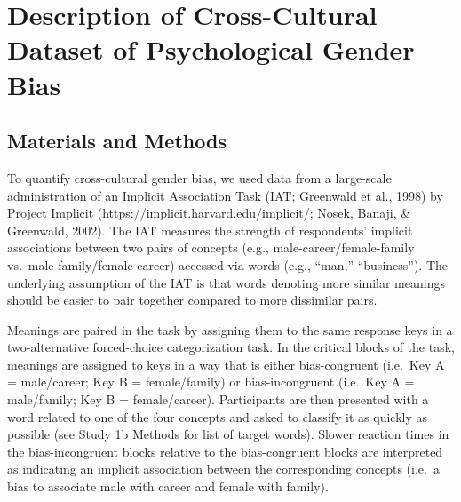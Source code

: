 \documentclass[9pt,twocolumn,twoside,lineno]{pnas-new}
\begin{document}
\section*{Description of Cross-Cultural Dataset of Psychological Gender
Bias}\label{description-of-cross-cultural-dataset-of-psychological-gender-bias}

\subsection*{Materials and Methods}\label{materials-and-methods}

To quantify cross-cultural gender bias, we used data from a large-scale
administration of an Implicit Association Task (IAT; Greenwald et al.,
1998) by Project Implicit (\url{https://implicit.harvard.edu/implicit/};
Nosek, Banaji, \& Greenwald, 2002). The IAT measures the strength of
respondents' implicit associations between two pairs of concepts (e.g.,
male-career/female-family vs.~male-family/female-career) accessed via
words (e.g., \enquote{man,} \enquote{business}). The underlying
assumption of the IAT is that words denoting more similar meanings
should be easier to pair together compared to more dissimilar pairs.

Meanings are paired in the task by assigning them to the same response
keys in a two-alternative forced-choice categorization task. In the
critical blocks of the task, meanings are assigned to keys in a way that
is either bias-congruent (i.e.~Key A = male/career; Key B =
female/family) or bias-incongruent (i.e.~Key A = male/family; Key B =
female/career). Participants are then presented with a word related to
one of the four concepts and asked to classify it as quickly as possible
(see Study 1b Methods for list of target words). Slower reaction times
in the bias-incongruent blocks relative to the bias-congruent blocks are
interpreted as indicating an implicit association between the
corresponding concepts (i.e.~a bias to associate male with career and
female with family).
\end{document}
